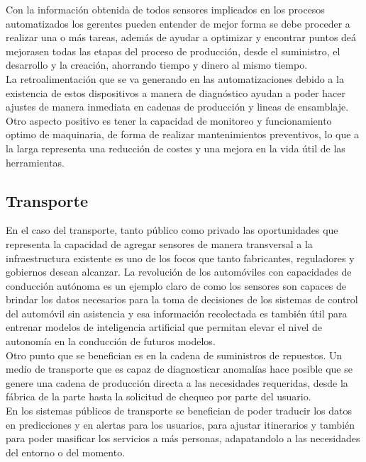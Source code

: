 Con la información obtenida de todos sensores implicados en los procesos automatizados los gerentes pueden entender de mejor forma se debe proceder a realizar una o más tareas, además de ayudar a optimizar y encontrar puntos deá mejorasen  todas las etapas del proceso de producción, desde el suministro, el desarrollo y la creación, ahorrando tiempo y dinero al mismo tiempo\cite{ibmiotindustria}.\\

La retroalimentación que se va generando en las automatizaciones debido a la existencia de estos dispositivos a manera de diagnóstico ayudan a poder hacer ajustes de manera inmediata en cadenas de producción y lineas de ensamblaje. Otro aspecto positivo es tener la capacidad de monitoreo y funcionamiento optimo de maquinaria, de forma de realizar mantenimientos preventivos, lo que a la larga representa una reducción de costes y una mejora en la vida útil de las herramientas. 

\subsection{Transporte}
En el caso del transporte, tanto público como privado las oportunidades que representa la capacidad de agregar sensores de manera transversal a la infraestructura existente es uno de los focos que tanto fabricantes, reguladores y gobiernos desean alcanzar. La revolución de los automóviles  con capacidades de conducción autónoma es un ejemplo claro de como los sensores son capaces de brindar los datos necesarios para la toma de decisiones de los sistemas de control del automóvil sin asistencia y esa información recolectada es también útil para entrenar modelos de inteligencia artificial que permitan elevar el nivel de autonomía en la conducción de futuros modelos\cite{ibmiottransporte1}.\\

Otro punto que se benefician es en la cadena de suministros de repuestos. Un medio de transporte que es capaz de diagnosticar anomalías hace posible que se genere una cadena de producción directa a las necesidades requeridas, desde la fábrica de la parte hasta la solicitud de chequeo por parte del usuario.\\ 
 
En los sistemas públicos de transporte se benefician de poder traducir los datos en predicciones y en alertas para los usuarios, para ajustar itinerarios y también para poder masificar los servicios a más personas, adapatandolo a las necesidades del entorno o del momento.\\

